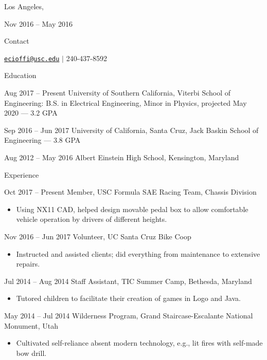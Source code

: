 \documentclass[11pt, letterpaper]{article}
\renewcommand*{\cvlabelfont}{\conds} %
\newcommand{\compactspacing}{\setlength{\itemsep}{-0.35em}} %
\newcommand{\describe}[1] {
    \begin{itemize}[label=---, topsep=-0.5em, itemindent=0em, labelsep=0.5em, leftmargin=2em]
    \small
    \item#1
    \end{itemize}
}
\begin{document}
\thispagestyle{empty} %

\begin{cv}{\color{blue}{Eric A. Cioffi}} %
\setlength{\cvlabelskip}{0.75em} %
\cvplace{} %
\noindent Los Angeles, \datemod

\settowidth{\cvlabelwidth} {\cvlabelfont Nov 2016 – May 2016} 
\begin{cvlist}{Contact}
    \item \href{mailto:ecioffi@usc.edu}{\nolinkurl{ecioffi@usc.edu}}
    $\mid$ 240-437-8592
\end{cvlist}

\begin{cvlist}{Education}
    \compactspacing
    
    \item[Aug 2017 – Present] University of Southern California, Viterbi School of Engineering:
    B.S. in Electrical Engineering, Minor in Physics, projected May 2020 --- 3.2 GPA
    \item[Sep 2016 – Jun 2017] University of California, Santa Cruz, Jack Baskin School of Engineering --- 3.8 GPA
    \item[Aug 2012 – May 2016] Albert Einstein High School, Kensington, Maryland
\end{cvlist}

\begin{cvlist}{Experience}
    \compactspacing

    \item[Oct 2017 – Present] Member, USC Formula SAE Racing Team, Chassis Division
    \describe{Using NX11 CAD, helped design movable pedal box to allow comfortable vehicle operation by drivers of different heights.}
    
    \item[Nov 2016 – Jun 2017] Volunteer, UC Santa Cruz Bike Coop
    \describe{Instructed and assisted clients; did everything from maintenance to extensive repairs.}
    
    \item[Jul 2014 – Aug 2014] Staff Assistant, TIC Summer Camp, Bethesda, Maryland
    \describe{Tutored children to facilitate their creation of games in Logo and Java.}
    
    \item[May 2014 – Jul 2014] Wilderness Program, Grand Staircase-Escalante National Monument, Utah
    \describe{Cultivated self-reliance absent modern technology, e.g., lit fires with self-made bow drill.}
\end{cvlist}


\end{cv}
\end{document}
